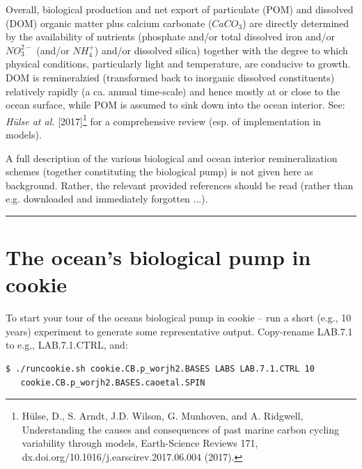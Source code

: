 Overall, biological production and net export of particulate (POM) and dissolved (DOM) organic matter plus calcium carbonate (\(CaCO_{3}\)) are directly determined by the availability of nutrients (phosphate and/or total dissolved iron and/or \(NO^{2-}_{3}\) (and/or \(NH^{+}_{4}\)) and/or dissolved silica) together with the degree to which physical conditions, particularly light and temperature, are conducive to growth. DOM is remineralzied (transformed back to inorganic dissolved constituents) relatively rapidly (a ca. annual time-scale) and hence mostly at or close to the ocean surface, while POM is assumed to sink down into the ocean interior. See: \textit{Hülse at al.} [2017]\footnote{Hülse, D., S. Arndt, J.D. Wilson, G. Munhoven, and A. Ridgwell, Understanding the causes and consequences of past marine carbon cycling variability through models, Earth-Science Reviews 171, dx.doi.org/10.1016/j.earscirev.2017.06.004 (2017).} for a comprehensive review (esp. of implementation in models).

\vspace{1mm}
A full description of the various biological and ocean interior remineralization schemes (together constituting the biological pump) is not given here as background. Rather, the relevant provided references should be read (rather than e.g. downloaded and immediately forgotten ...).

\vspace{1mm}\noindent\rule{4cm}{0.5pt}\vspace{2mm}

\newpage

\section{The ocean's biological pump in cookie}


To start your tour of the oceans biological pump in cookie -- run a short (e.g., 10 years) experiment to generate some representative output. Copy-rename \textsf{\footnotesize LAB.7.1} to e.g., \textsf{\footnotesize LAB.7.1.CTRL}, and:

\vspace{-1mm}\small\begin{verbatim}
$ ./runcookie.sh cookie.CB.p_worjh2.BASES LABS LAB.7.1.CTRL 10 
   cookie.CB.p_worjh2.BASES.caoetal.SPIN
\end{verbatim}\normalsize\vspace{-2mm}


